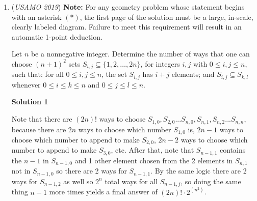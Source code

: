 \begin{enumerate}
 
Now, we extend our proof to general polynomials. If a polynomial $f(n)=a_0+a_1n+a_2n^2+...+a_xn^x$ satisfies the conditions of the problem, then for any $m,y>0$:
 \[f(m*10^y)=a_xm^x*10^{yx}+...+a_1m*10^y+a_0\]Similarly, choosing $y$ to be sufficiently large results in the terms not interfering with each other. If $f$ contains any monomials that do not satisfy the conditions of the problem, then picking suitable $m$ and sufficiently large $y$ causes $f(m*10^y)$ to not be in $K$. Thus, $f$ is a linear polynomial of the form $ax+b$ where $a$ is 0 or a power of 10, and $b\in K$. It suffices to rule out those polynomials where $a>0$ and $b>a$. If this is the case, then since the digit of $b$ corresponding to $a$ is not 7, there must be a single-digit number $n$ such that the digit of $f(n)$ corresponding to $a$ is 7. Therefore, we are done. 

 -wzs26843545602

 


	\item (\textit{USAMO 2019}) \textbf{Note:} For any geometry problem whose statement begins with an asterisk $(*)$, the first page of the solution must be a large, in-scale, clearly labeled diagram. Failure to meet this requirement will result in an automatic 1-point deduction.


 Let $n$ be a nonnegative integer. Determine the number of ways that one can choose $(n+1)^2$ sets $S_{i,j}\subseteq\{1,2,\ldots,2n\}$, for integers $i,j$ with $0\leq i,j\leq n$, such that:
for all $0\leq i,j\leq n$, the set $S_{i,j}$ has $i+j$ elements; and
$S_{i,j}\subseteq S_{k,l}$ whenever $0\leq i\leq k\leq n$ and $0\leq j\leq l\leq n$.


 



\textbf{Solution 1}

Note that there are $(2n)!$ ways to choose $S_{1, 0}, S_{2, 0}... S_{n, 0}, S_{n, 1}, S_{n, 2}... S_{n, n}$, because there are $2n$ ways to choose which number $S_{1, 0}$ is, $2n-1$ ways to choose which number to append to make $S_{2, 0}$, $2n-2$ ways to choose which number to append to make $S_{3, 0}$, etc. After that, note that $S_{n-1, 1}$ contains the $n-1$ in $S_{n-1, 0}$ and 1 other element chosen from the 2 elements in $S_{n, 1}$ not in $S_{n-1, 0}$ so there are 2 ways for $S_{n-1, 1}$. By the same logic there are 2 ways for $S_{n-1, 2}$ as well so $2^n$ total ways for all $S_{n-1, j}$, so doing the same thing $n-1$ more times yields a final answer of $(2n)!\cdot 2^{\left(n^2\right)}$.


\end{enumerate}
